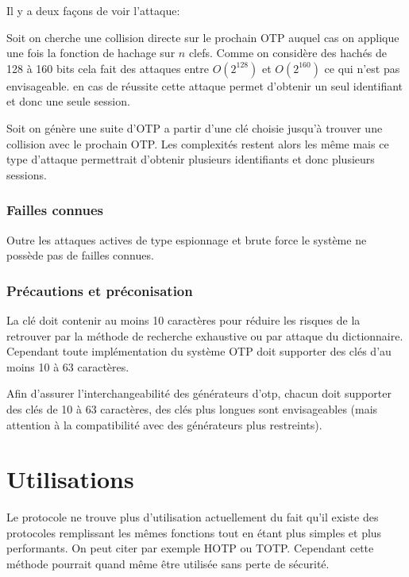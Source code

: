 \documentclass{../res/univ-projet}
\begin{document}
        Il y a deux façons de voir l'attaque: 
        
        Soit on cherche une collision directe sur
    le prochain OTP auquel cas on applique une fois la fonction de hachage sur $n$ clefs.
    Comme on considère des hachés de 128 à 160 bits cela fait des attaques entre $O(2^128)$
    et $O(2^160)$ ce qui n'est pas envisageable. en cas de réussite cette attaque permet 
    d'obtenir un seul identifiant et donc une seule session.
    
        Soit on génère une suite d'OTP a partir d'une clé choisie jusqu'à trouver
    une collision avec le prochain OTP. Les complexités restent alors les même mais ce type
    d'attaque permettrait d'obtenir plusieurs identifiants et donc plusieurs sessions.
    
    \subsubsection{Failles connues}
      Outre les attaques actives de type espionnage et brute force le système ne possède pas de failles connues.
    
    \subsubsection{Précautions et préconisation}
    La clé doit contenir au moins 10 caractères pour réduire les risques de la 
retrouver par la méthode de recherche exhaustive ou par attaque du dictionnaire. 
Cependant toute implémentation du système OTP doit supporter des clés d'au 
moins 10 à 63 caractères.

    Afin d'assurer l'interchangeabilité des générateurs d'otp, chacun doit 
supporter des clés de 10 à 63 caractères, des clés plus longues sont 
envisageables (mais attention à la compatibilité avec des générateurs plus 
restreints).
  
\section{Utilisations}
  Le protocole ne trouve plus d'utilisation actuellement du fait qu'il existe des protocoles remplissant
  les mêmes fonctions tout en étant plus simples et plus performants. On peut citer par exemple HOTP ou TOTP. Cependant
  cette méthode pourrait quand même être utilisée sans perte de sécurité.
  
\end{document}
